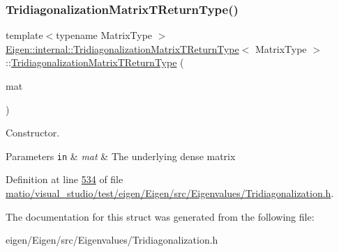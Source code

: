 \mbox{\label{struct_eigen_1_1internal_1_1_tridiagonalization_matrix_t_return_type_ac49f3c4df8b40dfa002c6e04e3d1b97f}} 
\subsubsection{\texorpdfstring{Tridiagonalization\+Matrix\+T\+Return\+Type()}{TridiagonalizationMatrixTReturnType()}\hspace{0.1cm}{\footnotesize\ttfamily [2/2]}}
{\footnotesize\ttfamily template$<$typename Matrix\+Type $>$ \\
\hyperlink{struct_eigen_1_1internal_1_1_tridiagonalization_matrix_t_return_type}{Eigen\+::internal\+::\+Tridiagonalization\+Matrix\+T\+Return\+Type}$<$ Matrix\+Type $>$\+::\hyperlink{struct_eigen_1_1internal_1_1_tridiagonalization_matrix_t_return_type}{Tridiagonalization\+Matrix\+T\+Return\+Type} (\begin{DoxyParamCaption}\item[{const Matrix\+Type \&}]{mat }\end{DoxyParamCaption})\hspace{0.3cm}{\ttfamily [inline]}}



Constructor. 


\begin{DoxyParams}[1]{Parameters}
\mbox{\tt in}  & {\em mat} & The underlying dense matrix \\
\hline
\end{DoxyParams}


Definition at line \hyperlink{matio_2visual__studio_2test_2eigen_2_eigen_2src_2_eigenvalues_2_tridiagonalization_8h_source_l00534}{534} of file \hyperlink{matio_2visual__studio_2test_2eigen_2_eigen_2src_2_eigenvalues_2_tridiagonalization_8h_source}{matio/visual\+\_\+studio/test/eigen/\+Eigen/src/\+Eigenvalues/\+Tridiagonalization.\+h}.



The documentation for this struct was generated from the following file\+:\begin{DoxyCompactItemize}
\item 
eigen/\+Eigen/src/\+Eigenvalues/\+Tridiagonalization.\+h\end{DoxyCompactItemize}
